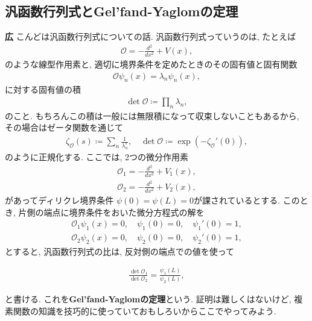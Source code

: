 \documentclass{ltjsarticle}
\theoremstyle{definition}
\begin{document}
\subsection{汎函数行列式とGel'fand-Yaglomの定理}
\noindent
\textbf{広} こんどは汎函数行列式についての話. 汎函数行列式っていうのは, たとえば
\begin{align}
  \mathcal O=-\frac{d^2}{dx^2}+V(x),
\end{align}
のような線型作用素と, 適切に境界条件を定めたときのその固有値と固有関数
\begin{align}
  \mathcal O\psi_n(x)=\lambda_n\psi_n(x),
\end{align}
に対する固有値の積
\begin{align}
  \det\mathcal O\coloneqq\prod_n\lambda_n,
\end{align}
のこと. もちろんこの積は一般には無限積になって収束しないこともあるから, その場合はゼータ関数を通じて
\begin{align}
  \zeta_{\mathcal O}(s)\coloneqq\sum_n\frac1{\lambda_n^s},\quad\det\mathcal O\coloneqq\exp\left(-\zeta_{\mathcal O}'(0)\right),
\end{align}
のように正規化する. ここでは, 2つの微分作用素
\begin{align}
  \mathcal{O}_1 = -\frac{d^2}{dx^2} + V_1(x),\\
  \mathcal{O}_2 = -\frac{d^2}{dx^2} + V_2(x),
\end{align}
があってディリクレ境界条件 $\psi(0) = \psi(L) = 0$が課されているとする. このとき, 片側の端点に境界条件をおいた微分方程式の解を
\begin{align}
  \mathcal{O}_1 \psi_1(x) = 0, \quad \psi_1(0) = 0, \quad \psi_1'(0) = 1,\\
  \mathcal{O}_2 \psi_2(x) = 0, \quad \psi_2(0) = 0, \quad \psi_2'(0) = 1,
\end{align}
とすると, 汎函数行列式の比は, 反対側の端点での値を使って
\begin{tcolorbox}
\begin{align}
  \frac{\det \mathcal{O}_1}{\det \mathcal{O}_2} = \frac{\psi_1(L)}{\psi_2(L)},\label{eq:gelfand_yaglom}
\end{align}
\end{tcolorbox}
\noindent
と書ける. これを\textbf{Gel'fand-Yaglomの定理}という. 証明は難しくはないけど, 複素関数の知識を技巧的に使っていておもしろいからここでやってみよう.
\end{document}
